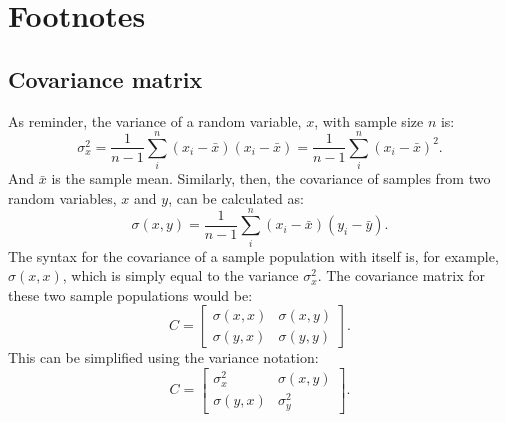 \documentclass[
  letterpaper,
  DIV=11,
  numbers=noendperiod]{scrreprt}
\begin{document}
\begin{figure}

\begin{minipage}[t]{0.50\linewidth}

{\centering 


}

\end{minipage}%
%
\begin{minipage}[t]{0.50\linewidth}

{\centering 


}

\end{minipage}%

\end{figure}

\hypertarget{footnotes-1}{%
\section{Footnotes}\label{footnotes-1}}

\hypertarget{sec-covariance}{%
\subsection{Covariance matrix}\label{sec-covariance}}

As reminder, the variance of a random variable, \(x\), with sample size
\(n\) is:
\[\sigma^2_x = \frac{1}{n-1} \sum_i^n (x_i - \bar{x})(x_i - \bar{x}) = \frac{1}{n-1} \sum_i^n (x_i - \bar{x})^2.\]
And \(\bar{x}\) is the sample mean. Similarly, then, the covariance of
samples from two random variables, \(x\) and \(y\), can be calculated
as:
\[\sigma(x,y) = \frac{1}{n-1} \sum_i^n (x_i - \bar{x})(y_i - \bar{y}).\]
The syntax for the covariance of a sample population with itself is, for
example, \(\sigma(x, x)\), which is simply equal to the variance
\(\sigma_x^2\). The covariance matrix for these two sample populations
would be: \[C = \begin{bmatrix}
\sigma(x,x) & \sigma(x,y)\\
\sigma(y,x) & \sigma(y,y)
\end{bmatrix}.\] This can be simplified using the variance notation:
\[C = \begin{bmatrix}
\sigma^2_x & \sigma(x,y)\\
\sigma(y,x) & \sigma^2_y
\end{bmatrix}.\]
\end{document}
